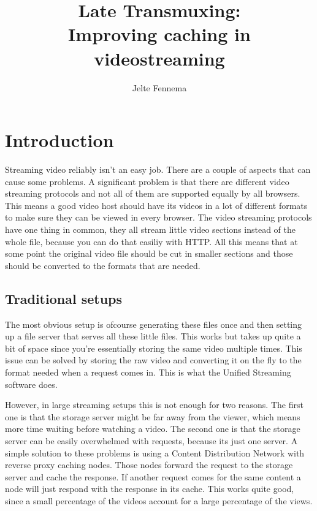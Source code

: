 \documentclass[twoside,openright]{uva-bachelor-thesis}
\title{Late Transmuxing:\\Improving caching in videostreaming}
\author{Jelte Fennema}
\begin{document}
\maketitle

\begin{abstract}
\end{abstract}


\tableofcontents

\chapter{Introduction}
Streaming video reliably isn't an easy job. There are a couple of aspects that
can cause some problems. A significant problem is that there are different video
streaming protocols and not all of them are supported equally by all browsers.
This means a good video host should have its videos in a lot of different
formats to make sure they can be viewed in every browser. The video streaming
protocols have one thing in common, they all stream little video sections
instead of the whole file, because you can do that easiliy with
HTTP\autocite{http}. All this means that at some point the original video file
should be cut in smaller sections and those should be converted to the formats
that are needed.


\section{Traditional setups}
The most obvious setup is ofcourse generating these files once and then setting
up a file server that serves all these little files. This works but takes up
quite a bit of space since you're essentially storing the same video multiple
times. This issue can be solved by storing the raw video and converting it on
the fly to the format needed when a request comes in. This is what the Unified
Streaming software does.

However, in large streaming setups this is not enough for two reasons. The first
one is that the storage server might be far away from the viewer, which means
more time waiting before watching a video. The second one is that the storage
server can be easily overwhelmed with requests, because its just one server. A
simple solution to these problems is using a Content Distribution
Network\autocite{cdns} with reverse proxy caching\autocite{revproxy} nodes.
Those nodes forward the request to the storage server and cache the response. If
another request comes for the same content a node will just respond with the
response in its cache. This works quite good, since a small percentage of the
videos account for a large percentage of the views.
\end{document}
